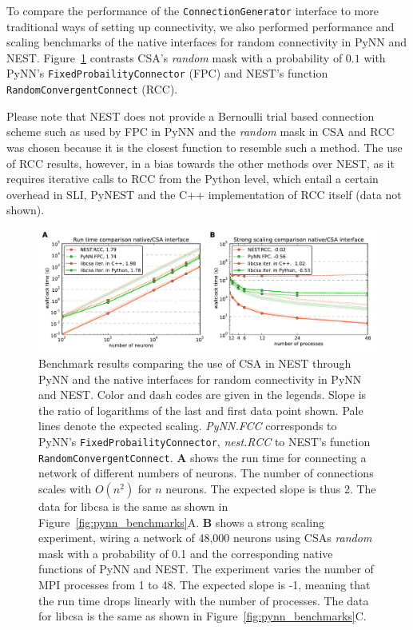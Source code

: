 \documentclass{frontiersSCNS} %
\newcommand{\INLINEFIGS}{} %
\newcommand{\Figure}[2]{Figure~\ref{#2}}
\newcommand{\Figure}[2]{Figure~#1}
\begin{document}
To compare the performance of the \verb|ConnectionGenerator| interface
to more traditional ways of setting up connectivity, we also performed
performance and scaling benchmarks of the native interfaces for random
connectivity in PyNN and NEST. \Figure{5}{fig:native_benchmarks}
contrasts CSA's \emph{random} mask with a probability of $0.1$ with
PyNN's \verb|FixedProbailityConnector| (FPC) and NEST's function
\verb|RandomConvergentConnect| (RCC).

Please note that NEST does not provide a Bernoulli trial based
connection scheme such as used by FPC in PyNN and the \emph{random}
mask in CSA and RCC was chosen because it is the closest function to
resemble such a method. The use of RCC results, however, in a bias
towards the other methods over NEST, as it requires iterative calls to
RCC from the Python level, which entail a certain overhead in SLI,
PyNEST and the C++ implementation of RCC itself (data not shown).

\ifdefined\INLINEFIGS
\begin{figure}[ht]
\centering
\includegraphics[scale=.7]{benchmarks/native_routines.pdf}
\caption{Benchmark results comparing the use of CSA in NEST through
  PyNN and the native interfaces for random connectivity in PyNN and
  NEST. Color and dash codes are given in the legends. Slope is the
  ratio of logarithms of the last and first data point shown. Pale
  lines denote the expected scaling. \emph{PyNN.FCC} corresponds to
  PyNN's \texttt{FixedProbailityConnector}, \emph{nest.RCC} to NEST's
  function \texttt{RandomConvergentConnect}. \textbf{A} shows the run
  time for connecting a network of different numbers of neurons. The
  number of connections scales with $O(n^2)$ for $n$ neurons. The
  expected slope is thus 2. The data for libcsa is the same as shown
  in \Figure{4}{fig:pynn_benchmarks}A. \textbf{B} shows a strong
  scaling experiment, wiring a network of 48,000 neurons using CSAs
  \emph{random} mask with a probability of 0.1 and the corresponding
  native functions of PyNN and NEST. The experiment varies the number
  of MPI processes from 1 to 48. The expected slope is -1, meaning
  that the run time drops linearly with the number of processes. The
  data for libcsa is the same as shown in
  \Figure{4}{fig:pynn_benchmarks}C.}\label{fig:native_benchmarks}
\end{figure}
\fi
\end{document}
